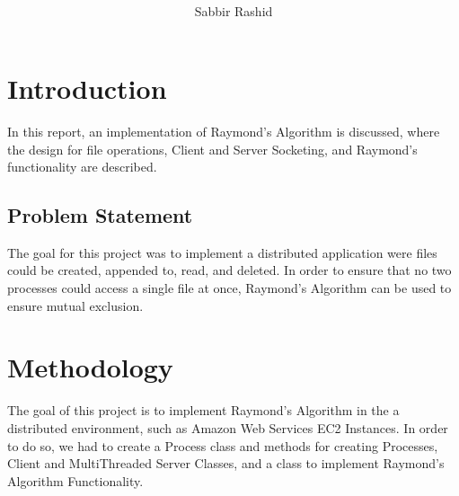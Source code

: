 \documentclass{article}
\title{
\textmd{\textbf{\ProjectTitle}}\\
\author{
	Sabbir Rashid\\
	\bf{\Institution}}
	\date{} %
}
\begin{document}

\setlength{\parindent}{8ex}

\tableofcontents
\newpage
\maketitle
\section{Introduction}
\label{sec:Introduction}
In this report, an implementation of Raymond's Algorithm is discussed, where the design for file operations, Client and Server Socketing, and Raymond's functionality are described.

	\subsection{Problem Statement}
	\label{subsec:ProblemStatement}
	The goal for this project was to implement a distributed application were files could be created, appended to, read, and deleted. In order to ensure that no two processes could access a single file at once, Raymond's Algorithm can be used to ensure mutual exclusion.

\section{Methodology}
The goal of this project is to implement Raymond's Algorithm in the a distributed environment, such as Amazon Web Services EC2 Instances. In order to do so, we had to create a Process class and methods for creating Processes, Client and MultiThreaded Server Classes, and a class to implement Raymond's Algorithm Functionality.
\end{document}
